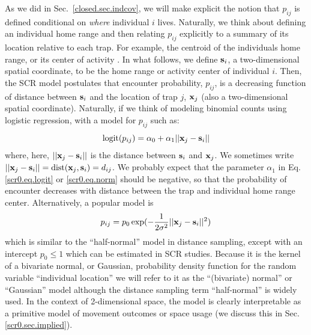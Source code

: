 As we did in Sec.~\ref{closed.sec.indcov}, we will make explicit the
notion that $p_{ij}$ is defined conditional on {\it where} individual
$i$ lives. Naturally, we think about defining an individual home range
and then relating $p_{ij}$ explicitly to a summary of its location
relative to each trap. For example, the centroid of the
individuals home range, or its center of activity \citep{efford:2004,
  borchers_efford:2008, royle_young:2008}.  In what follows, we define ${\bf
  s}_{i}$, a two-dimensional spatial coordinate, to be the home range
or activity center of individual $i$. Then, the SCR model postulates
that encounter probability, $p_{ij}$, is a decreasing function of
distance between ${\bf s}_{i}$ and the location of trap $j$, ${\bf
  x}_{j}$ (also a two-dimensional spatial coordinate).  
Naturally, if we think of modeling binomial counts using
logistic regression, with a model for $p_{ij}$ such as:
\begin{equation}
	\mbox{logit}(p_{ij}) = \alpha_{0} + \alpha_1 ||{\bf x}_{j}-{\bf s}_{i} ||
\label{scr0.eq.logit}
\end{equation}
where, here, $||{\bf x}_{j}-{\bf s}_{i}||$ is the distance between
${\bf s}_{i}$ and ${\bf x}_{j}$. We sometimes write $||{\bf
  x}_{j}-{\bf s}_{i}|| = \mbox{dist}({\bf x}_{j},{\bf s}_{i}) =
d_{ij}$.  We probably expect that the parameter $\alpha_{1}$ in
Eq. \ref{scr0.eq.logit} or \ref{scr0.eq.norm} should be negative, so
that the probability of encounter decreases with distance between the
trap and individual home range center.  Alternatively, a popular model
is
\begin{equation}
p_{ij} = p_{0}\exp(-\frac{1}{2\sigma^{2}}||{\bf x}_{j}-{\bf s}_{i}||^2)
\label{scr0.eq.norm}
\end{equation}
which is similar to the ``half-normal'' model in distance sampling,
except with an intercept $p_{0} \le 1$ which can be estimated in SCR
studies.  Because it is the kernel of a bivariate normal, or Gaussian,
probability density function for the random variable ``individual
location'' we will refer to it as the ``(bivariate) normal'' or
``Gaussian'' model although the distance sampling term ``half-normal''
is widely used.
In the context of 2-dimensional space, the model is
clearly interpretable as a primitive model of movement outcomes or
space usage (we discuss this in Sec. \ref{scr0.sec.implied}).


